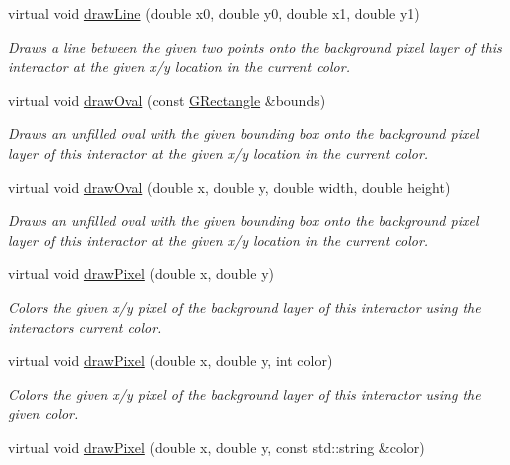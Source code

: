 \begin{DoxyCompactItemize}
virtual void \mbox{\hyperlink{classGDrawingSurface_aff299fe83178d2f3ce8c08c06b583484}{draw\+Line}} (double x0, double y0, double x1, double y1)
\begin{DoxyCompactList}\small\item\em Draws a line between the given two points onto the background pixel layer of this interactor at the given x/y location in the current color. \end{DoxyCompactList}\item 
virtual void \mbox{\hyperlink{classGDrawingSurface_a8adc13027efe311b4a6a715205b8bc46}{draw\+Oval}} (const \mbox{\hyperlink{classGRectangle}{G\+Rectangle}} \&bounds)
\begin{DoxyCompactList}\small\item\em Draws an unfilled oval with the given bounding box onto the background pixel layer of this interactor at the given x/y location in the current color. \end{DoxyCompactList}\item 
virtual void \mbox{\hyperlink{classGDrawingSurface_aa5b1cf902e578907da3c63060686354e}{draw\+Oval}} (double x, double y, double width, double height)
\begin{DoxyCompactList}\small\item\em Draws an unfilled oval with the given bounding box onto the background pixel layer of this interactor at the given x/y location in the current color. \end{DoxyCompactList}\item 
virtual void \mbox{\hyperlink{classGDrawingSurface_a0c1e2923d8d163d62d0896d8c5cfa191}{draw\+Pixel}} (double x, double y)
\begin{DoxyCompactList}\small\item\em Colors the given x/y pixel of the background layer of this interactor using the interactor\textquotesingle{}s current color. \end{DoxyCompactList}\item 
virtual void \mbox{\hyperlink{classGDrawingSurface_a3a64eb6383e601be8438e9c71643c432}{draw\+Pixel}} (double x, double y, int color)
\begin{DoxyCompactList}\small\item\em Colors the given x/y pixel of the background layer of this interactor using the given color. \end{DoxyCompactList}\item 
virtual void \mbox{\hyperlink{classGDrawingSurface_a20abc26a94b7eb310e34abf668e0f5f4}{draw\+Pixel}} (double x, double y, const std\+::string \&color)

\end{DoxyCompactItemize}
